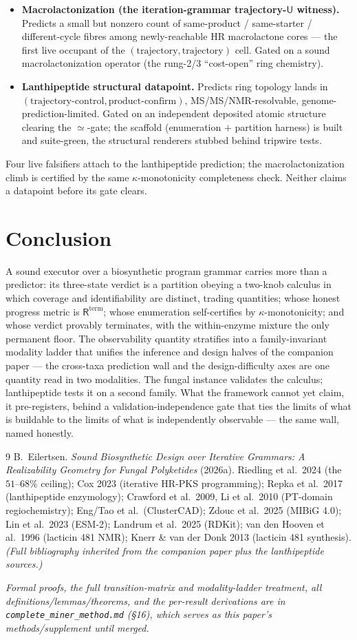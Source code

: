 \documentclass[11pt]{article}
\newcommand{\U}{\mathsf{U}}
\newcommand{\Rterm}{\mathsf{R}^{\mathrm{term}}}
\begin{document}
\begin{itemize}[leftmargin=1.4em,itemsep=2pt]
\item \textbf{Macrolactonization (the iteration-grammar trajectory-$\U$ witness).} Predicts a small but
nonzero count of same-product / same-starter / different-cycle fibres among newly-reachable HR
macrolactone cores --- the first live occupant of the $(\text{trajectory},\text{trajectory})$ cell.
Gated on a sound macrolactonization operator (the rung-2/3 ``cost-open'' ring chemistry).
\item \textbf{Lanthipeptide structural datapoint.} Predicts ring topology lands in
$(\text{trajectory-control},\text{product-confirm})$, MS/MS/NMR-resolvable, genome-prediction-limited.
Gated on an independent deposited atomic structure clearing the $\simeq$-gate; the scaffold
(enumeration $+$ partition harness) is built and suite-green, the structural renderers stubbed behind
tripwire tests.
\end{itemize}

Four live falsifiers attach to the lanthipeptide prediction; the macrolactonization climb is certified
by the same $\kappa$-monotonicity completeness check. Neither claims a datapoint before its gate clears.

\section{Conclusion}
A sound executor over a biosynthetic program grammar carries more than a predictor: its three-state
verdict is a partition obeying a two-knob calculus in which coverage and identifiability are distinct,
trading quantities; whose honest progress metric is $\Rterm$; whose enumeration self-certifies by
$\kappa$-monotonicity; and whose verdict provably terminates, with the within-enzyme mixture the only
permanent floor. The observability quantity stratifies into a family-invariant modality ladder that
unifies the inference and design halves of the companion paper --- the cross-taxa prediction wall and
the design-difficulty axes are one quantity read in two modalities. The fungal instance validates the
calculus; lanthipeptide tests it on a second family. What the framework cannot yet claim, it
pre-registers, behind a validation-independence gate that ties the limits of what is buildable to the
limits of what is independently observable --- the same wall, named honestly.

\begin{thebibliography}{9}
 B.~Eilertsen. \emph{Sound Biosynthetic Design over Iterative Grammars: A Realizability
Geometry for Fungal Polyketides} (2026a).
 Riedling et al.\ 2024 (the $51$--$68\%$ ceiling); Cox 2023 (iterative HR-PKS
programming); Repka et al.\ 2017 (lanthipeptide enzymology); Crawford et al.\ 2009, Li et al.\ 2010
(PT-domain regiochemistry); Eng/Tao et al.\ (ClusterCAD); Zdouc et al.\ 2025 (MIBiG 4.0); Lin et al.\
2023 (ESM-2); Landrum et al.\ 2025 (RDKit); van den Hooven et al.\ 1996 (lacticin 481 NMR); Knerr \&
van der Donk 2013 (lacticin 481 synthesis). \emph{(Full bibliography inherited from the companion paper
plus the lanthipeptide sources.)}
\end{thebibliography}

\noindent\emph{Formal proofs, the full transition-matrix and modality-ladder treatment, all
definitions/lemmas/theorems, and the per-result derivations are in \texttt{complete\_miner\_method.md}
(\S16), which serves as this paper's methods/supplement until merged.}
\end{document}
